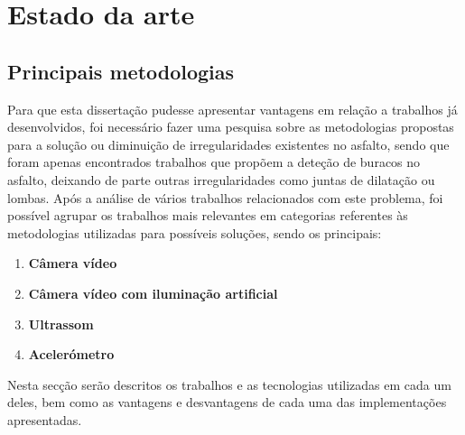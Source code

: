 \chapter{Estado da arte}
\label{cha:estado_da_arte}

\section{Principais metodologias} %
\label{sec:principais_metodologias}

Para que esta dissertação pudesse apresentar vantagens em relação a trabalhos já desenvolvidos, foi necessário fazer uma pesquisa sobre as metodologias propostas para a solução ou diminuição de irregularidades existentes no asfalto, sendo que foram apenas encontrados trabalhos que propõem a deteção de buracos no asfalto, deixando de parte outras irregularidades como juntas de dilatação ou lombas. 
Após a análise de vários trabalhos relacionados com este problema, foi possível agrupar os trabalhos mais relevantes em categorias referentes às metodologias utilizadas para possíveis soluções, sendo os principais:
\begin{enumerate}
	\item \textbf{Câmera vídeo}
	\item \textbf{Câmera vídeo com iluminação artificial}
	\item \textbf{Ultrassom}
	\item \textbf{Acelerómetro}
\end{enumerate}
Nesta secção serão descritos os trabalhos e as tecnologias utilizadas em cada um deles, bem como as vantagens e desvantagens de cada uma das implementações apresentadas.

